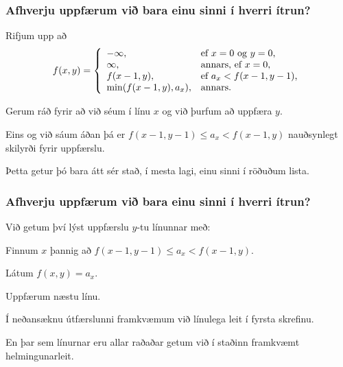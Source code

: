 {
	\frametitle{Afhverju uppfærum við bara einu sinni í hverri ítrun?}
	{
		\item<1-> Rifjum upp að
		\[
			f(x, y) = \left \{
			\env{array}
			{ {l l}
				-\infty, & \text{ef $x = 0$ og $y = 0$,} \\
				\infty, & \text{annars, ef $x = 0$,} \\
				f(x - 1, y), & \text{ef $a_x < f(x - 1, y - 1)$,} \\
				\min(f(x - 1, y), a_x), & \text{annars.}
			}
			\right .
		\]
		\item<2-> Gerum ráð fyrir að við séum í línu $x$ og við þurfum að uppfæra $y$.
		\item<3-> Eins og við sáum áðan þá er $f(x - 1, y - 1) \leq a_x < f(x - 1, y)$ nauðsynlegt skilyrði fyrir uppfærslu.
		\item<4-> Þetta getur þó bara átt sér stað, í mesta lagi, einu sinni í röðuðum lista.
	}
}

{
	\frametitle{Afhverju uppfærum við bara einu sinni í hverri ítrun?}
	{
		\item<1-> Við getum því lýst uppfærslu $y$-tu línunnar með:
		{
			\item<2-> Finnum $x$ þannig að $f(x - 1, y - 1) \leq a_x < f(x - 1, y)$.
			\item<3-> Látum $f(x, y) = a_x$.
			\item<4-> Uppfærum næstu línu.
		}
		\item<5-> Í neðansæknu útfærslunni framkvæmum við línulega leit í fyrsta skrefinu.
		\item<6-> En þar sem línurnar eru allar raðaðar getum við í staðinn framkvæmt helmingunarleit.
	}
}

{
}

{
}


